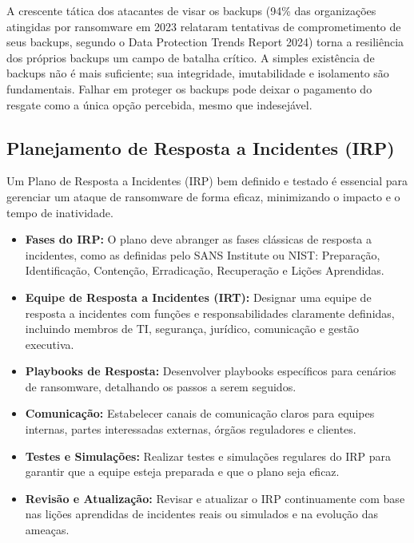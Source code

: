 A crescente tática dos atacantes de visar os backups (94\% das organizações atingidas por ransomware em 2023 relataram tentativas de comprometimento de seus backups, segundo o Data Protection Trends Report 2024) torna a resiliência dos próprios backups um campo de batalha crítico. A simples existência de backups não é mais suficiente; sua integridade, imutabilidade e isolamento são fundamentais. Falhar em proteger os backups pode deixar o pagamento do resgate como a única opção percebida, mesmo que indesejável.

\subsection{Planejamento de Resposta a Incidentes (IRP)}
Um Plano de Resposta a Incidentes (IRP) bem definido e testado é essencial para gerenciar um ataque de ransomware de forma eficaz, minimizando o impacto e o tempo de inatividade.
\begin{itemize}
    \item \textbf{Fases do IRP:} O plano deve abranger as fases clássicas de resposta a incidentes, como as definidas pelo SANS Institute ou NIST: Preparação, Identificação, Contenção, Erradicação, Recuperação e Lições Aprendidas.
    \item \textbf{Equipe de Resposta a Incidentes (IRT):} Designar uma equipe de resposta a incidentes com funções e responsabilidades claramente definidas, incluindo membros de TI, segurança, jurídico, comunicação e gestão executiva.
    \item \textbf{Playbooks de Resposta:} Desenvolver playbooks específicos para cenários de ransomware, detalhando os passos a serem seguidos.
    \item \textbf{Comunicação:} Estabelecer canais de comunicação claros para equipes internas, partes interessadas externas, órgãos reguladores e clientes.
    \item \textbf{Testes e Simulações:} Realizar testes e simulações regulares do IRP para garantir que a equipe esteja preparada e que o plano seja eficaz.
    \item \textbf{Revisão e Atualização:} Revisar e atualizar o IRP continuamente com base nas lições aprendidas de incidentes reais ou simulados e na evolução das ameaças.
\end{itemize}

